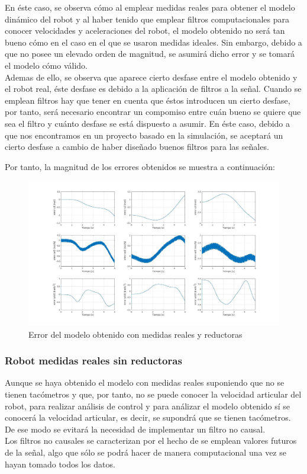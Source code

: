 En éste caso, se observa cómo al emplear medidas reales para obtener el modelo dinámico del robot y al haber tenido que emplear filtros computacionales para conocer velocidades y aceleraciones del robot, el modelo obtenido no será tan bueno cómo en el caso en el que se usaron medidas ideales. Sin embargo, debido a que no posee un elevado orden de magnitud, se asumirá dicho error y se tomará el modelo cómo válido.\\
Ademas de ello, se observa que aparece cierto desfase entre el modelo obtenido y el robot real, éste desfase es debido a la aplicación de filtros a la señal. Cuando se emplean filtros hay que tener en cuenta que éstos introducen un cierto desfase, por tanto, será necesario encontrar un compomiso entre cuán bueno se quiere que sea el filtro y cuánto desfase se está dispuesto a asumir. En éste caso, debido a que nos encontramos en un proyecto basado en la simulación, se aceptará un cierto desfase a cambio de haber diseñado buenos filtros para las señales.

\newpage
Por tanto, la magnitud de los errores obtenidos se muestra a continuación:

\begin{figure}[h!]
	\centering
	\includegraphics[width=1\textwidth]{EstimacParam_SisModError_In1_RealCR}
	\caption{Error del modelo obtenido con medidas reales y reductoras}
\end{figure}

\subsubsection{Robot medidas reales sin reductoras}
Aunque se haya obtenido el modelo con medidas reales suponiendo que no se tienen tacómetros y que, por tanto, no se puede conocer la velocidad articular del robot, para realizar análisis de control y para análizar el modelo obtenido sí se conocerá la velocidad articular, es decir, se supondrá que se tienen tacómetros. De ese modo se evitará la necesidad de implementar un filtro no causal. \\
Los filtros no causales se caracterizan por el hecho de se emplean valores futuros de la señal, algo que sólo se podrá hacer de manera computacional una vez se hayan tomado todos los datos.\\

